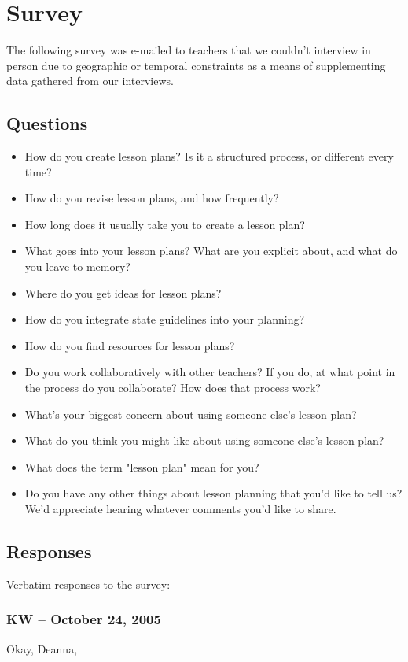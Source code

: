 \documentclass[10pt,letter]{article}
\begin{document}
\section{Survey}
\label{survey}
The following survey was e-mailed to teachers that we couldn't interview in
person due to geographic or temporal constraints as a means of supplementing
data gathered from our interviews.

\subsection{Questions}
\begin{itemize}
\item How do you create lesson plans?  Is it a structured process, or different
      every time?
\item How do you revise lesson plans, and how frequently?
\item How long does it usually take you to create a lesson plan?
\item What goes into your lesson plans?  What are you explicit about, and what
      do you leave to memory?
\item Where do you get ideas for lesson plans?
\item How do you integrate state guidelines into your planning?
\item How do you find resources for lesson plans?
\item Do you work collaboratively with other teachers?  If you do, at what point
      in the process do you collaborate?  How does that process work?
\item What's your biggest concern about using someone else's lesson plan?
\item What do you think you might like about using someone else's lesson plan?
\item What does the term "lesson plan" mean for you?
\item Do you have any other things about lesson planning that you'd like to tell
      us?  We'd appreciate hearing whatever comments you'd like to share.
\end{itemize}

\subsection{Responses}
Verbatim responses to the survey:

\subsubsection{KW -- October 24, 2005}
Okay, Deanna,
\end{document}
